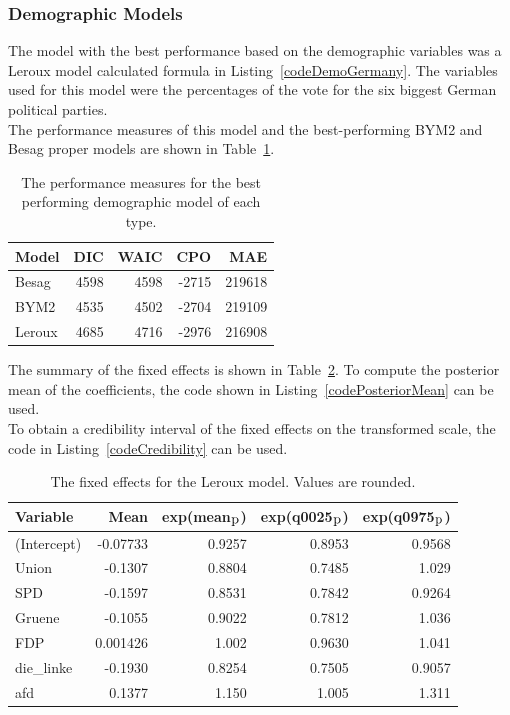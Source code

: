 \subsubsection{Demographic Models}\label{sssec:demoGermany}
The model with the best performance based on the demographic variables was a Leroux model calculated formula in Listing~\ref{codeDemoGermany}. The variables used for this model were the percentages of the vote for the six biggest German political parties. \\
The performance measures of this model and the best-performing BYM2 and Besag proper models are shown in Table~\ref{demoGermany}. 
\begin{table}[H] 
\caption{The performance measures for the best performing demographic model of each type. \label{demoGermany}}
\begin{tabular}{l r r r r}
\toprule
\textbf{Model}	& \textbf{DIC}	& \textbf{WAIC} & \textbf{CPO} & \textbf{MAE}\\
\midrule
Besag  & 4598 & 4598 & -2715 & 219618 \\
BYM2 & 4535 & 4502 & -2704 & 219109\\
Leroux & 4685  & 4716 & -2976 & 216908\\
\bottomrule
\end{tabular}
\end{table}
The summary of the fixed effects is shown in Table~\ref{fixedDemoGermany}. To compute the posterior mean of the coefficients, the code shown in Listing~\ref{codePosteriorMean} can be used. \\
To obtain a credibility interval of the fixed effects on the transformed scale, the code in Listing~\ref{codeCredibility} can be used. \\
\begin{table}[H] 
\caption{The fixed effects for the Leroux model. Values are rounded. \label{fixedDemoGermany}}
\begin{tabular}{l r r r r}
\toprule
\textbf{Variable}	& \textbf{Mean}	& \textbf{exp(mean$_{\hbox{p}}$)} & \textbf{exp(q0025$_{\hbox{p}}$)} & \textbf{exp(q0975$_{\hbox{p}}$)} \\
\midrule
(Intercept) & -0.07733 & 0.9257 & 0.8953 & 0.9568 \\
Union & -0.1307 & 0.8804 & 0.7485 & 1.029 \\
SPD & -0.1597 & 0.8531 & 0.7842 & 0.9264 \\
Gruene & -0.1055 & 0.9022 & 0.7812 & 1.036 \\
FDP & 0.001426 & 1.002 & 0.9630 & 1.041 \\
die\_linke & -0.1930 & 0.8254 & 0.7505 & 0.9057 \\
afd & 0.1377 & 1.150 & 1.005 & 1.311 \\
\bottomrule
\end{tabular}
\end{table}

